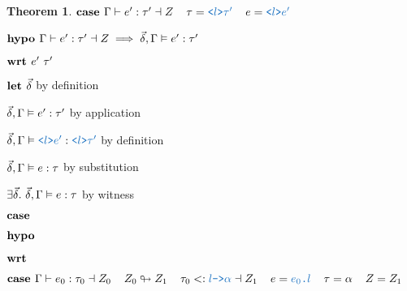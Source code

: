 \documentclass[acmsmall]{acmart}
\theoremstyle{definition}
\newtheorem{theorem}{Theorem}[section]
\begin{document}
\begin{theorem}
  \item \Z $\B{case } 
    \Gamma \entails e' \hastype \tau' \given Z
    \I
    \tau = \obj{<$l$>$\tau'$}
    \I
    e = \obj{<$l$>$e'$} 
  $ 
  \item \Z $\textbf{hypo } 
      \Gamma \vdash e' : \tau' \dashv Z  
      \implies
      \vec{\delta}, \Gamma \vDash e' : \tau'
  $ 
  \item \Z $\textbf{wrt } e' \ \tau'$ 
    \item \Z\Z $\textbf{let } \vec{\delta} $ by definition
    \item \Z\Z $
      \vec{\delta}, \Gamma \vDash e' : \tau'
    $ by application
    \item \Z\Z $
      \vec{\delta}, \Gamma \satisfies \obj{<$l$>$e'$} \hastype \obj{<$l$>$\tau'$}
    $ by definition
    \item \Z\Z $
      \vec{\delta}, \Gamma \vDash e : \tau 
    $ by substitution
    \item \Z\Z $
      \exists \vec{\delta} .\ \vec{\delta}, \Gamma \vDash e : \tau 
    $ by witness 

  \item \Z {} 
  \item \Z $\textbf{case } $ 
  \item \Z $\textbf{hypo } $ 
  \item \Z $\textbf{wrt } $ 



  \item \Z $\B{case } 
    \Gamma \entails e_0 \hastype \tau_0 \given Z_0
    \I
    Z_0 \looparrowright Z_1
    \I
    \tau_0 \subtypes \obj{$l$->$\alpha$} \given Z_1
    \I
    e = \obj{$e_0$.$l$} \I \tau = \alpha \I Z = Z_1
  $
   

\end{theorem}
\end{document}
